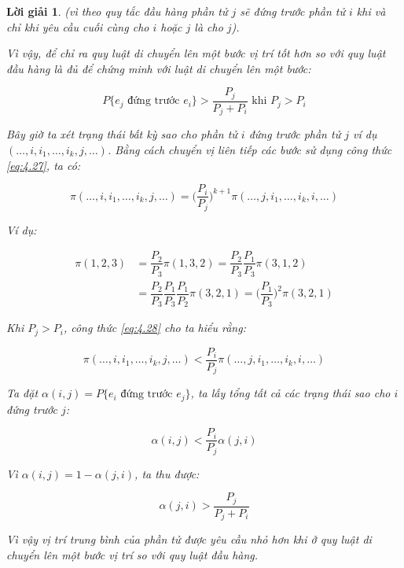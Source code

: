 \documentclass[14pt, a4paper]{article}
\numberwithin{equation}{section}
\numberwithin{figure}{section}
\theoremstyle{sltheorem}
\theoremstyle{soltheorem}
\newtheorem*{loigiai}{Lời giải}
\numberwithin{dl}{section}
\numberwithin{md}{section}
\numberwithin{vd}{section}
\begin{document}
\begin{loigiai}
        (vì theo quy tắc đầu hàng phần tử $j$ sẽ đứng trước phần tử $i$ khi và chỉ khi yêu cầu cuối cùng cho $i$ hoặc $j$ là cho $j$).

        Vì vậy, để chỉ ra quy luật di chuyển lên một bước vị trí tốt hơn so với quy luật đầu hàng là đủ để chứng minh với luật di chuyển lên một bước:

        \begin{equation*}
            P \lbrace e_j \text{ đứng trước } e_i \rbrace > \dfrac{P_j}{P_j + P_i} \text{ khi } P_j > P_i
        \end{equation*}

        Bây giờ ta xét trạng thái bất kỳ sao cho phần tử $i$ đứng trước phần tử $j$ ví dụ $(\dots, i, i_1, \dots, i_k, j, \dots)$.
        Bằng cách chuyển vị liên tiếp các bước sử dụng công thức \ref{eq:4.27}, ta có:

        \begin{equation} \label{eq:4.28}
            \pi (\dots, i, i_1, \dots, i_k, j, \dots) = \Bigg ( \dfrac{P_i}{P_j} \Bigg)^{k+1} \pi (\dots, j, i_1, \dots, i_k, i, \dots)
        \end{equation}

        Ví dụ:

        \begin{equation*}
            \begin{aligned}
                \pi (1, 2, 3) &= \dfrac{P_2}{P_3} \pi (1, 3, 2) = \dfrac{P_2}{P_3} \dfrac{P_1}{P_3} \pi (3, 1, 2) \\
                &= \dfrac{P_2}{P_3} \dfrac{P_1}{P_3} \dfrac{P_1}{P_2} \pi (3, 2, 1) = \Bigg( \dfrac{P_1}{P_3} \Bigg)^2 \pi(3, 2, 1)
            \end{aligned}
        \end{equation*}

        Khi $P_j > P_i$, công thức \ref{eq:4.28} cho ta hiểu rằng:

        \begin{equation*}
            \pi (\dots, i, i_1, \dots, i_k, j, \dots) < \dfrac{P_i}{P_j} \pi (\dots, j, i_1, \dots, i_k, i, \dots)
        \end{equation*}

        Ta đặt $\alpha(i, j) = P \lbrace e_i \text{ đứng trước } e_j \rbrace$, ta lấy tổng tất cả các trạng thái sao cho $i$ đứng trước $j$:

        \begin{equation*}
            \alpha (i, j) < \dfrac{P_i}{P_j} \alpha (j, i)
        \end{equation*}

        Vì $\alpha(i, j) = 1 - \alpha(j, i)$, ta thu được:

        \begin{equation*}
            \alpha (j, i) > \dfrac{P_j}{P_j + P_i}
        \end{equation*}

        Vì vậy vị trí trung bình của phần tử được yêu cầu nhỏ hơn khi ở quy luật di chuyển lên một bước vị trí so với quy luật đầu hàng.    
    \end{loigiai}
\end{document}
